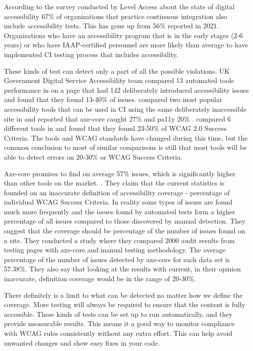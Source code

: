 \documentclass{master_thesis}
\begin{document}
According to the survey conducted by Level Access about the state of digital accessibility 67\% of organizations that practice continuous integration also include accessibility tests. This has gone up from 56\% reported in 2021. Organizations who have an accessibility program that is in the early stages (2-6 years) or who have IAAP-certified personnel are more likely than average to have implemented CI testing process that includes accessibility. \citep{LevelAccess}

These kinds of test can detect only a part of all the possible violations. UK Government Digital Service Accessibility team compared 13 automated tools performance in \citeyear{GAT2018} on a page that had 142 deliberately introduced accessibility issues and found that they found 13-40\% of issues. \citeauthor{Abbott2021} compared two most popular accessibility tools that can be used in CI using the same deliberately inaccessible site in \citeyear{Abbott2021} and reported that axe-core caught 27\% and pa11y 20\% \citep{Abbott2021}. \citeauthor{Vigo2013} compared 6 different tools in \citeyear{Vigo2013} and found that they found 23-50\% of  WCAG 2.0 Success Criteria. \citep{GAT2018,Abbott2021,Vigo2013} The tools and WCAG standards have changed during this time, but the common conclusion to most of similar comparisons is still that most tools will be able to detect errors on 20-30\% or WCAG Success Criteria. 

Axe-core promises to find on average 57\% issues, which is significantly higher than other tools on the market.  \citep{Deque2023}. They claim that the current statistics is founded on an inaccurate definition of accessibility coverage - percentage of individual WCAG Success Criteria. In reality some types of issues are found much more frequently and the issues found by automated tests form a higher percentage of all issues compared to those discovered by manual detection. They suggest that the coverage should be percentage of the number of issues found on a site.  They conducted a study where they compared 2000 audit results from testing pages with axe-core and manual testing methodology. The average percentage of the number of issues detected by axe-core for each data set is 57.38\%. They also say that looking at the results with current, in their opinion inaccurate, definition coverage would be in the range of 20-30\%. \citep{DequeSystems2021report}

There definitely is a limit to what can be detected no matter how we define the coverage. More testing will always be required to ensure that the content is fully accessible. These kinds of tests can be set up to run automatically, and they provide measurable results. This means it a good way to monitor compliance with WCAG rules consistently without any extra effort. This can help avoid unwanted changes and show easy fixes in  your code.
\end{document}
